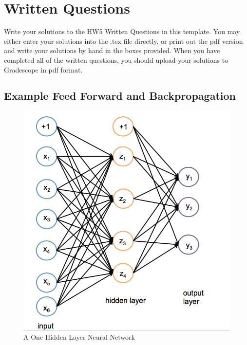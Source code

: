 \section{Written Questions}
\label{sec:written}

Write your solutions to the HW5 Written Questions in this template. You may either enter your solutions into the .tex file directly, or print out the pdf version and write your solutions by hand in the boxes provided.  When you have completed all of the written questions, you should upload your solutions to Gradescope in pdf format.
    
\subsection{Example Feed Forward and Backpropagation}
\label{sec:onelayertoy}

 \begin{figure}[h]
        \centering
        \includegraphics[scale=0.7]{oneHL6.png}
        \caption{A One Hidden Layer Neural Network}
        \label{fig:oneHL}
    \end{figure}


